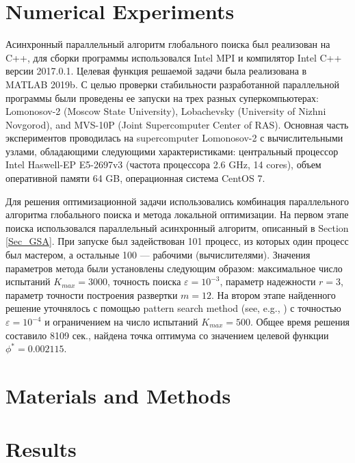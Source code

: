 \documentclass[mathematics,article,submit,pdftex,moreauthors]{Definitions/mdpi}
\begin{document}
\section{Numerical Experiments}

Асинхронный параллельный алгоритм глобального поиска был реализован на C++, для сборки программы использовался Intel MPI и компилятор Intel C++ версии 2017.0.1. Целевая функция решаемой задачи была реализована в MATLAB 2019b.
С целью проверки стабильности разработанной параллельной программы были проведены ее запуски на трех разных суперкомпьютерах: Lomonosov-2 (Moscow State University), Lobachevsky (University of Nizhni Novgorod), and MVS-10P (Joint Supercomputer Center of RAS). Основная часть экспериментов проводилась на supercomputer Lomonosov-2 с вычислительными узлами, обладающими следующими характеристиками: центральный процессор Intel Haswell-EP E5-2697v3 (частота процессора 2.6 GHz, 14 cores), объем оперативной памяти 64 GB, операционная система CentOS 7.

Для решения оптимизационной задачи использовались комбинация параллельного алгоритма глобального поиска и метода локальной оптимизации. На первом этапе поиска использовался параллельный асинхронный алгоритм, описанный в Section \ref{Sec_GSA}. При запуске был задействован 101 процесс, из которых один процесс был мастером, а остальные 100 --- рабочими (вычислителями). Значения параметров метода были установлены следующим образом: максимальное число испытаний $K_{max}=3000$, точность поиска $\varepsilon=10^{-3}$, параметр надежности $r=3$, параметр точности построения развертки $m=12$. На втором этапе найденного решение уточнялось с помощью pattern search method (see, e.g., \cite{Torczon1997}) с точностью $\varepsilon=10^{-4}$ и ограничением на число испытаний $K_{max}=500$.
Общее время решения составило 8109 сек., найдена точка оптимума со значением целевой функции $\phi^* = 0.002115$.





\section{Materials and Methods}


\section{Results}
\end{document}
